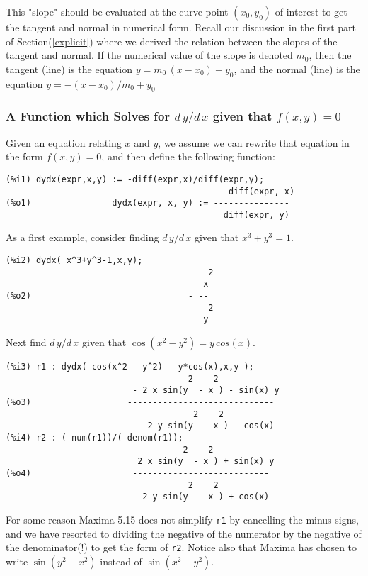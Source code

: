 \documentclass[12pt]{article}
\begin{document}
This "slope" should be evaluated at the curve point $(x_0,y_0)$ of interest
  to get the tangent and normal in numerical form.  
Recall our discussion in the first part of Section(\ref{explicit}) where we
  derived the relation between the slopes of the tangent and normal.
If the numerical value of the slope is denoted $m_0$, then the tangent (line) is the
  equation $y  = m_0 \, (x - x_{0}) + y_{0}$, and the normal (line) is the
  equation $y  = -(x - x_{0})/m_0 + y_{0}$

\subsubsection*{A Function which Solves for $d\,y/d\,x$ given that $f(x,y) = 0$}
Given an equation relating $x$ and $y$, we assume we can rewrite that equation in
  the form $f(x,y) = 0$, and then define the following function:
\small
\begin{verbatim}
(%i1) dydx(expr,x,y) := -diff(expr,x)/diff(expr,y);
                                          - diff(expr, x)
(%o1)                dydx(expr, x, y) := ---------------
                                           diff(expr, y)
\end{verbatim}
\normalsize
As a first example, consider finding $d\,y/d\,x$ given that $x^3 + y^3 = 1$.
\small
\begin{verbatim}
(%i2) dydx( x^3+y^3-1,x,y);
                                        2
                                       x
(%o2)                               - --
                                        2
                                       y
\end{verbatim}
\normalsize


Next find $d\,y/d\,x$ given that $\cos(x^2 - y^2) = y \, cos(x)$.
\small
\begin{verbatim}
(%i3) r1 : dydx( cos(x^2 - y^2) - y*cos(x),x,y );
                                    2    2
                         - 2 x sin(y  - x ) - sin(x) y
(%o3)                   -----------------------------
                                     2    2
                          - 2 y sin(y  - x ) - cos(x)
(%i4) r2 : (-num(r1))/(-denom(r1));
                                   2    2
                          2 x sin(y  - x ) + sin(x) y
(%o4)                    ---------------------------
                                    2    2
                           2 y sin(y  - x ) + cos(x)
\end{verbatim}
\normalsize
For some reason Maxima 5.15 does not simplify \verb|r1| by cancelling the minus signs,
  and we have resorted to dividing the negative of the numerator by the negative of
  the denominator(!) to get the form of \verb|r2|.
Notice also that Maxima has chosen to write $\sin(y^2 - x^2)$ instead of $\sin(x^2-y^2)$.
\end{document}
